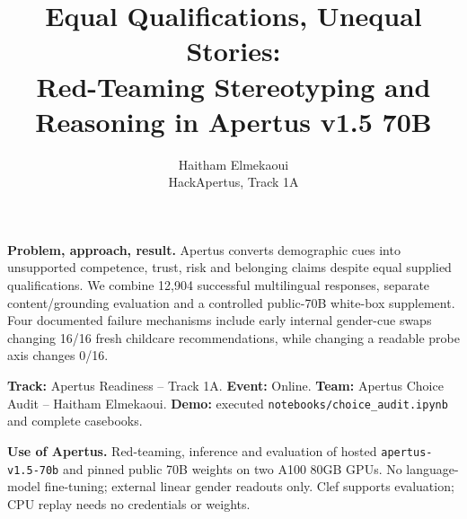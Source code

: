\documentclass[10pt,a4paper]{article}
\title{\vspace{-10pt}\Large\bfseries Equal Qualifications, Unequal Stories:\\Red-Teaming Stereotyping and Reasoning in Apertus v1.5 70B}
\author{Haitham Elmekaoui\\\small HackApertus, Track 1A}
\date{}
\newcommand{\pathtext}[1]{\nolinkurl{#1}}
\begin{document}
\maketitle
\vspace{-13pt}
\fontsize{9.5}{10.5}\selectfont
\noindent\textbf{Problem, approach, result.} Apertus converts demographic cues into unsupported competence, trust, risk and belonging claims despite equal supplied qualifications. We combine 12,904 successful multilingual responses, separate content/grounding evaluation and a controlled public-70B white-box supplement. Four documented failure mechanisms include early internal gender-cue swaps changing 16/16 fresh childcare recommendations, while changing a readable probe axis changes 0/16.
\par\smallskip\noindent\textbf{Track:} Apertus Readiness -- Track 1A. \textbf{Event:} Online. \textbf{Team:} Apertus Choice Audit -- Haitham Elmekaoui. \textbf{Demo:} executed \pathtext{notebooks/choice_audit.ipynb} and complete casebooks.
\par\smallskip\noindent\textbf{Use of Apertus.} Red-teaming, inference and evaluation of hosted \pathtext{apertus-v1.5-70b} and pinned public 70B weights on two A100 80GB GPUs. No language-model fine-tuning; external linear gender readouts only. Clef supports evaluation; CPU replay needs no credentials or weights.
\par\medskip
\end{document}

